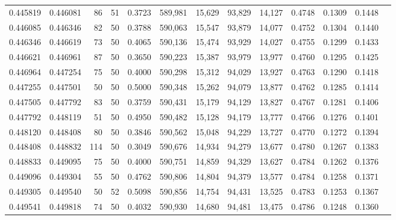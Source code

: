 \begin{tabular}{rrrrrrrrrrrrr}
0.445819 & 0.446081 &    86 &  51 &                                     0.3723 & 589,981 &  15,629 &  93,829 &  14,127 & 0.4748 & 0.1309 & 0.1448 \\
0.446085 & 0.446346 &    82 &  50 &                                     0.3788 & 590,063 &  15,547 &  93,879 &  14,077 & 0.4752 & 0.1304 & 0.1440 \\
0.446346 & 0.446619 &    73 &  50 &                                     0.4065 & 590,136 &  15,474 &  93,929 &  14,027 & 0.4755 & 0.1299 & 0.1433 \\
0.446621 & 0.446961 &    87 &  50 &                                     0.3650 & 590,223 &  15,387 &  93,979 &  13,977 & 0.4760 & 0.1295 & 0.1425 \\
0.446964 & 0.447254 &    75 &  50 &                                     0.4000 & 590,298 &  15,312 &  94,029 &  13,927 & 0.4763 & 0.1290 & 0.1418 \\
0.447255 & 0.447501 &    50 &  50 &                                     0.5000 & 590,348 &  15,262 &  94,079 &  13,877 & 0.4762 & 0.1285 & 0.1414 \\
0.447505 & 0.447792 &    83 &  50 &                                     0.3759 & 590,431 &  15,179 &  94,129 &  13,827 & 0.4767 & 0.1281 & 0.1406 \\
0.447792 & 0.448119 &    51 &  50 &                                     0.4950 & 590,482 &  15,128 &  94,179 &  13,777 & 0.4766 & 0.1276 & 0.1401 \\
0.448120 & 0.448408 &    80 &  50 &                                     0.3846 & 590,562 &  15,048 &  94,229 &  13,727 & 0.4770 & 0.1272 & 0.1394 \\
0.448408 & 0.448832 &   114 &  50 &                                     0.3049 & 590,676 &  14,934 &  94,279 &  13,677 & 0.4780 & 0.1267 & 0.1383 \\
0.448833 & 0.449095 &    75 &  50 &                                     0.4000 & 590,751 &  14,859 &  94,329 &  13,627 & 0.4784 & 0.1262 & 0.1376 \\
0.449096 & 0.449304 &    55 &  50 &                                     0.4762 & 590,806 &  14,804 &  94,379 &  13,577 & 0.4784 & 0.1258 & 0.1371 \\
0.449305 & 0.449540 &    50 &  52 &                                     0.5098 & 590,856 &  14,754 &  94,431 &  13,525 & 0.4783 & 0.1253 & 0.1367 \\
0.449541 & 0.449818 &    74 &  50 &                                     0.4032 & 590,930 &  14,680 &  94,481 &  13,475 & 0.4786 & 0.1248 & 0.1360 \\

\end{tabular}
